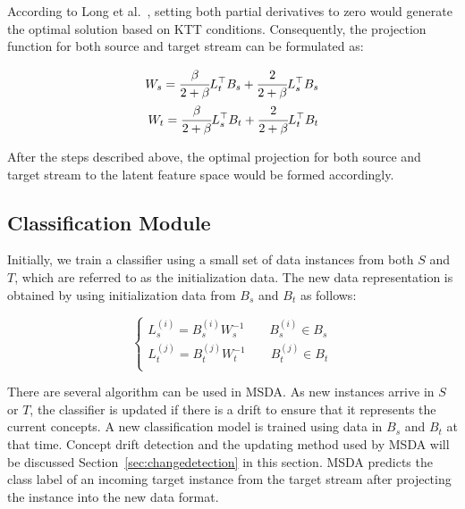 According to Long et al.~\cite{long2008general}, setting both partial derivatives to zero would generate the optimal solution based on KTT conditions.
Consequently, the projection function for both source and target stream can be formulated as:

\begin{equation}
\begin{split}
    W_s = \cfrac{\beta}{2+\beta} L_{t}^\top B_{s} + \cfrac{2}{2+\beta} L_{s}^\top B_{s} \\
    W_t = \cfrac{\beta}{2+\beta} L_{s}^\top B_{t} + \cfrac{2}{2+\beta} L_{t}^\top B_{t} \\
\end{split}
\end{equation}

After the steps described above, the optimal projection for both source and target stream to the latent feature space would be formed accordingly. 



\subsection{Classification Module}

Initially, we train a classifier using a small set of data instances from both $S$ and $T$, which are referred to as the initialization data. The new data representation is obtained by using initialization data from $B_s$ and $B_t$ as follows:

\begin{equation}
\begin{cases}
L_s^{(i)}=B_s^{(i)}W_s^{-1} \qquad B_s^{(i)}\in B_s \\
L_t^{(j)}=B_t^{(j)}W_t^{-1} \qquad {B}_t^{(j)}\in {B}_t\\
\end{cases}
\end{equation}

There are several algorithm can be used in MSDA. As new instances arrive in $S$ or $T$, the classifier is updated if there is a drift to ensure that it represents the current concepts. A new classification model is trained using data in $B_s$ and $B_t$ at that time. Concept drift detection and the updating method used by MSDA will be discussed Section~\ref{sec:changedetection} in this section. MSDA predicts the  class label of an incoming target instance from the target stream after projecting the instance into the new data format.


